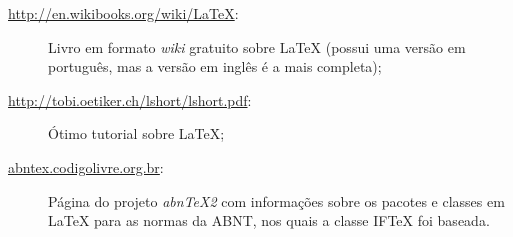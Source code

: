 \begin{description}
 \item[\url{http://en.wikibooks.org/wiki/LaTeX}:] Livro em formato \textit{wiki} gratuito sobre {\LaTeX} (possui uma versão em português, mas a versão em inglês é a mais completa);
 \item[\url{http://tobi.oetiker.ch/lshort/lshort.pdf}:] Ótimo tutorial sobre {\LaTeX};
 \item[\url{abntex.codigolivre.org.br}:] Página do projeto \textit{abnTeX2} com informações sobre os pacotes e classes em {\LaTeX} para as normas da ABNT, nos quais a classe {IF\TeX} foi baseada.
\end{description}
